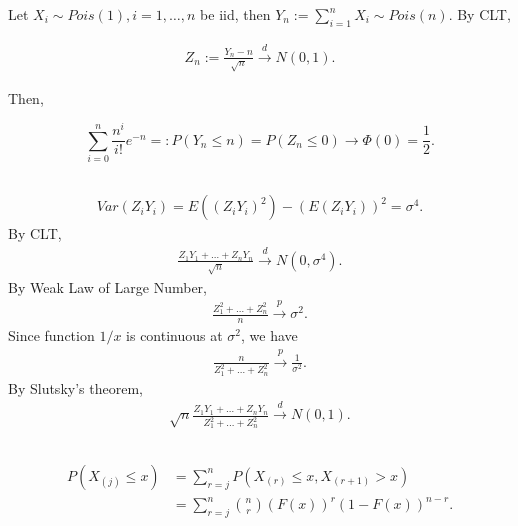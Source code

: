 Let $X_i\sim Pois(1), i=1,\dots,n$ be iid, then $Y_n:=\sum_{i=1}^{n}X_i\sim Pois(n)$.
By CLT,

\begin{align}
    Z_n:=\frac{Y_n-n}{\sqrt{n}} \xrightarrow{d} N(0, 1).
\end{align}

Then,

\begin{equation}
    \sum_{i=0}^n \frac{n^i}{i!}e^{-n} =: P(Y_n\le n) = P(Z_n\le 0) \rightarrow \Phi(0) = \frac{1}{2}.
\end{equation}

\subsection{} %

\begin{align}
    Var(Z_iY_i) = E((Z_iY_i)^2) - (E(Z_iY_i))^2 = \sigma^4.
\end{align}
By CLT,
\begin{align}
    \frac{Z_1Y_1+\dots+Z_nY_n}{\sqrt{n}}\xrightarrow{d} N(0, \sigma^4).
\end{align}
By Weak Law of Large Number,
\begin{align}
    \frac{Z_1^2+\dots+Z_n^2}{n}\xrightarrow{p} \sigma^2.
\end{align}
Since function $1/x$ is continuous at $\sigma^2$, we have
\begin{align}
    \frac{n}{Z_1^2+\dots+Z_n^2}\xrightarrow{p} \frac{1}{\sigma^2}.
\end{align}
By Slutsky’s theorem,
\begin{align}
    \sqrt{n}\frac{Z_1Y_1+\dots+Z_nY_n}{Z_1^2+\dots+Z_n^2}\xrightarrow{d}  N(0, 1).
\end{align}

\subsection{} %

\begin{align}
    P(X_{(j)}\le x)
        &= \sum_{r=j}^n P(X_{(r)}\le x, X_{(r+1)}>x) \\
        &= \sum_{r=j}^n \binom{n}{r}(F(x))^r(1-F(x))^{n-r}.
\end{align}

